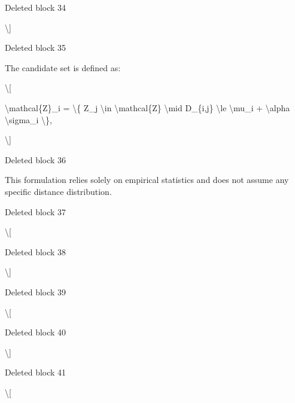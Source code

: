 \documentclass[a4paper,fleqn]{cas-dc}
\newenvironment{RevisionDeletion}{%
  \par\begingroup\color{revisionred}\footnotesize\ttfamily
  \setlength{\parindent}{0pt}\setlength{\parskip}{1pt}\obeyspaces
}{\par\endgroup}
\begin{document}
\begin{RevisionDeletion}
Deleted block 34\par
\textbackslash{}]\par
\end{RevisionDeletion}

\begin{RevisionDeletion}
Deleted block 35\par
The candidate set is defined as:\par
\textbackslash{}[\par
\textbackslash{}mathcal\{Z\}\_i = \textbackslash{}\{ Z\_j \textbackslash{}in \textbackslash{}mathcal\{Z\} \textbackslash{}mid D\_\{i,j\} \textbackslash{}le \textbackslash{}mu\_i + \textbackslash{}alpha \textbackslash{}sigma\_i \textbackslash{}\},\par
\textbackslash{}]\par
\end{RevisionDeletion}

\begin{RevisionDeletion}
Deleted block 36\par
This formulation relies solely on empirical statistics and does not assume any specific distance distribution.\par
\end{RevisionDeletion}

\begin{RevisionDeletion}
Deleted block 37\par
\textbackslash{}[\par
\end{RevisionDeletion}

\begin{RevisionDeletion}
Deleted block 38\par
\textbackslash{}]\par
\end{RevisionDeletion}

\begin{RevisionDeletion}
Deleted block 39\par
\textbackslash{}[\par
\end{RevisionDeletion}

\begin{RevisionDeletion}
Deleted block 40\par
\textbackslash{}]\par
\end{RevisionDeletion}

\begin{RevisionDeletion}
Deleted block 41\par
\textbackslash{}[\par
\end{RevisionDeletion}
\end{document}
